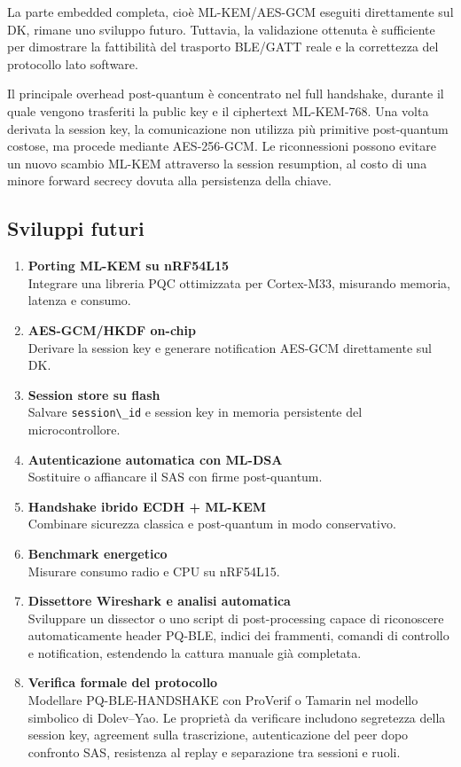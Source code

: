 \documentclass[11pt,a4paper]{article}
\newcommand{\passthrough}[1]{#1}
\begin{document}
La parte embedded completa, cioè ML-KEM/AES-GCM eseguiti direttamente
sul DK, rimane uno sviluppo futuro. Tuttavia, la validazione ottenuta è
sufficiente per dimostrare la fattibilità del trasporto BLE/GATT reale e
la correttezza del protocollo lato software.

Il principale overhead post-quantum è concentrato nel full handshake,
durante il quale vengono trasferiti la public key e il ciphertext
ML-KEM-768. Una volta derivata la session key, la comunicazione non
utilizza più primitive post-quantum costose, ma procede mediante
AES-256-GCM. Le riconnessioni possono evitare un nuovo scambio ML-KEM
attraverso la session resumption, al costo di una minore forward secrecy
dovuta alla persistenza della chiave.

\subsection{Sviluppi futuri}\label{sviluppi-futuri}

\begin{enumerate}
\def\labelenumi{\arabic{enumi}.}
\item
  \textbf{Porting ML-KEM su nRF54L15}\\
  Integrare una libreria PQC ottimizzata per Cortex-M33, misurando
  memoria, latenza e consumo.
\item
  \textbf{AES-GCM/HKDF on-chip}\\
  Derivare la session key e generare notification AES-GCM direttamente
  sul DK.
\item
  \textbf{Session store su flash}\\
  Salvare \passthrough{\lstinline!session\_id!} e session key in memoria
  persistente del microcontrollore.
\item
  \textbf{Autenticazione automatica con ML-DSA}\\
  Sostituire o affiancare il SAS con firme post-quantum.
\item
  \textbf{Handshake ibrido ECDH + ML-KEM}\\
  Combinare sicurezza classica e post-quantum in modo conservativo.
\item
  \textbf{Benchmark energetico}\\
  Misurare consumo radio e CPU su nRF54L15.
\item
  \textbf{Dissettore Wireshark e analisi automatica}\\
  Sviluppare un dissector o uno script di post-processing capace di riconoscere automaticamente header PQ-BLE, indici dei frammenti, comandi di controllo e notification, estendendo la cattura manuale già completata.
\item
  \textbf{Verifica formale del protocollo}\\
  Modellare PQ-BLE-HANDSHAKE con ProVerif o Tamarin nel modello simbolico
  di Dolev--Yao. Le proprietà da verificare includono segretezza della
  session key, agreement sulla trascrizione, autenticazione del peer dopo
  confronto SAS, resistenza al replay e separazione tra sessioni e ruoli.
\end{enumerate}
\end{document}
